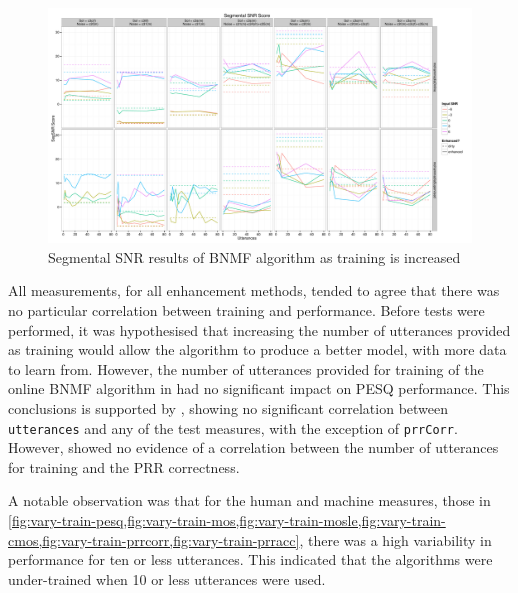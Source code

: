 \begin{figure}[p]
\noindent \begin{centering}
\includegraphics[angle=90,width=1\textwidth,height=0.95\textheight,keepaspectratio]{fig/R/train/segSNR}
\par\end{centering}

\protect\caption{\label{fig:vary-train-segsnr}Segmental \acs{SNR} results of \acs{BNMF}
algorithm as training is increased}
\end{figure}


\clearpage{}

All measurements, for all enhancement methods, tended to agree that
there was no particular correlation between training and performance.
Before tests were performed, it was hypothesised that increasing the
number of utterances provided as training would allow the algorithm
to produce a better model, with more data to learn from. However,
the number of utterances provided for training of the online \ac{BNMF}
algorithm in  had no significant impact on
\ac{PESQ} performance. This conclusions is supported by ,
showing no significant correlation between \lstinline!utterances!
and any of the test measures, with the exception of \lstinline!prrCorr!.
However,  showed no evidence of a correlation
between the number of utterances for training and the \ac{PRR} correctness.

A notable observation was that for the human and machine measures,
those in \cref{fig:vary-train-pesq,fig:vary-train-mos,fig:vary-train-mosle,fig:vary-train-cmos,fig:vary-train-prrcorr,fig:vary-train-prracc},
there was a high variability in performance for ten or less utterances.
This indicated that the algorithms were under-trained when 10 or less
utterances were used.

